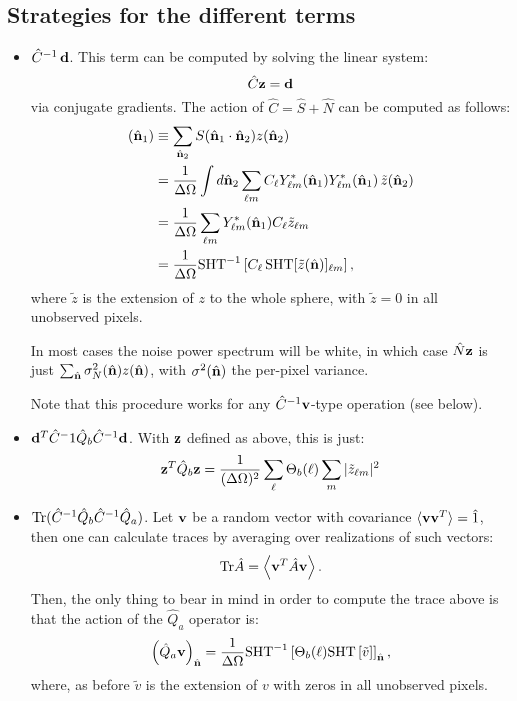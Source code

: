 \documentclass[a4paper,10pt]{article}
\newcommand{\Tr}{{\rm Tr}}
\newcommand{\nv}{\hat{\bf n}}
\begin{document}
\subsection{Strategies for the different terms}
\begin{itemize}
\item $\hat{C}^{-1}\,{\bf d}$. This term can be computed by solving the linear system:
\begin{equation}
  \hat{C}{\bf z}={\bf d}
\end{equation}
via conjugate gradients. The action of $\hat{C}=\hat{S}+\hat{N}$ can be computed as follows:
\begin{align}
 [\hat{S}{\bf z}](\nv_1)&\equiv\sum_{\nv_2}S(\nv_1\cdot\nv_2)z(\nv_2)\\
                        &=\frac{1}{\Delta\Omega}\int d\nv_2\sum_{\ell m}C_\ell
                          Y^*_{\ell m}(\nv_1)Y^*_{\ell m}(\nv_1)\,\tilde{z}(\nv_2)\\
                        &=\frac{1}{\Delta\Omega}\sum_{\ell m} Y^*_{\ell m}(\nv_1)C_\ell \tilde{z}_{\ell m}\\
                        &=\frac{1}{\Delta\Omega}
{\rm SHT}^{-1}\left[C_\ell\,{\rm SHT}[\tilde{z}(\nv)]_{\ell m}\right],
\end{align}
where $\tilde{z}$ is the extension of $z$ to the whole sphere, with $\tilde{z}=0$ in all unobserved pixels.

In most cases the noise power spectrum will be white, in which case $\hat{N}{\bf z}$ is just
$\sum_{\nv}\sigma_N^2(\nv)z(\nv)$, with $\sigma^2(\nv)$ the per-pixel variance.

Note that this procedure works for any $\hat{C}^{-1}{\bf v}$-type operation (see below).


\item ${\bf d}^T\hat{C}^-1\hat{Q}_b\hat{C}^{-1}{\bf d}$. With ${\bf z}$ defined as above, this is just:
\begin{align}
 {\bf z}^T\hat{Q}_b{\bf z}=\frac{1}{(\Delta\Omega)^2}\sum_\ell\Theta_b(\ell)\sum_m|\tilde{z}_{\ell m}|^2
\end{align}
\item $\Tr(\hat{C}^{-1}\hat{Q}_b\hat{C}^{-1}\hat{Q}_a)$. Let ${\bf v}$ be a random vector with covariance
 $\langle {\bf v}{\bf v}^T\rangle=\hat{1}$, then one can calculate traces by averaging over realizations of such
 vectors:
 \begin{equation}
   \Tr{\hat{A}}=\left\langle {\bf v}^T\hat{A}{\bf v}\right\rangle.
 \end{equation}
 Then, the only thing to bear in mind in order to compute the trace above is that the action of the
 $\hat{Q}_a$ operator is:
 \begin{equation}
   \left(\hat{Q}_a{\bf v}\right)_{\nv}=\frac{1}{\Delta\Omega}{\rm SHT}^{-1}\left[\Theta_b(\ell){\rm SHT}\left[\tilde{v}\right]\right]_{\nv},
 \end{equation}
 where, as before $\tilde{v}$ is the extension of $v$ with zeros in all unobserved pixels.


\end{itemize}
\end{document}
